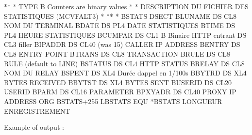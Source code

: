 \documentclass[letterpaper,10pt,english]{sphinxmanual}
\begin{document}
\begin{sphinxVerbatim}[commandchars=\\\{\}]
*\PYGZhy{}\PYGZhy{}\PYGZhy{}\PYGZhy{}\PYGZhy{}\PYGZhy{}\PYGZhy{}\PYGZhy{}\PYGZhy{}\PYGZhy{}\PYGZhy{}\PYGZhy{}\PYGZhy{}\PYGZhy{}\PYGZhy{}\PYGZhy{}\PYGZhy{}\PYGZhy{}\PYGZhy{}\PYGZhy{}\PYGZhy{}\PYGZhy{}\PYGZhy{}\PYGZhy{}\PYGZhy{}\PYGZhy{}\PYGZhy{}\PYGZhy{}\PYGZhy{}\PYGZhy{}\PYGZhy{}\PYGZhy{}\PYGZhy{}\PYGZhy{}\PYGZhy{}\PYGZhy{}\PYGZhy{}\PYGZhy{}\PYGZhy{}\PYGZhy{}\PYGZhy{}\PYGZhy{}\PYGZhy{}\PYGZhy{}\PYGZhy{}\PYGZhy{}\PYGZhy{}\PYGZhy{}\PYGZhy{}\PYGZhy{}\PYGZhy{}\PYGZhy{}\PYGZhy{}\PYGZhy{}\PYGZhy{}\PYGZhy{}\PYGZhy{}\PYGZhy{}\PYGZhy{}\PYGZhy{}*
*        TYPE B \PYGZhy{} Counters are binary values                 *
*        DESCRIPTION DU FICHIER DES STATISTIQUES (MCVFALT3)  *
*\PYGZhy{}\PYGZhy{}\PYGZhy{}\PYGZhy{}\PYGZhy{}\PYGZhy{}\PYGZhy{}\PYGZhy{}\PYGZhy{}\PYGZhy{}\PYGZhy{}\PYGZhy{}\PYGZhy{}\PYGZhy{}\PYGZhy{}\PYGZhy{}\PYGZhy{}\PYGZhy{}\PYGZhy{}\PYGZhy{}\PYGZhy{}\PYGZhy{}\PYGZhy{}\PYGZhy{}\PYGZhy{}\PYGZhy{}\PYGZhy{}\PYGZhy{}\PYGZhy{}\PYGZhy{}\PYGZhy{}\PYGZhy{}\PYGZhy{}\PYGZhy{}\PYGZhy{}\PYGZhy{}\PYGZhy{}\PYGZhy{}\PYGZhy{}\PYGZhy{}\PYGZhy{}\PYGZhy{}\PYGZhy{}\PYGZhy{}\PYGZhy{}\PYGZhy{}\PYGZhy{}\PYGZhy{}\PYGZhy{}\PYGZhy{}\PYGZhy{}\PYGZhy{}\PYGZhy{}\PYGZhy{}\PYGZhy{}\PYGZhy{}\PYGZhy{}\PYGZhy{}\PYGZhy{}\PYGZhy{}*
*
BSTATS   DSECT
B\PYGZdl{}LUNAME DS    CL8                     NOM DU TERMINAL
B\PYGZdl{}DATE   DS    PL4                     DATE STATISTIQUES
B\PYGZdl{}TIME   DS    PL4                     HEURE STATISTIQUES
B\PYGZdl{}CUMPAR DS    CL1                     B Binaire HTTP entrant
         DS    CL3                     filler
B\PYGZdl{}IPADDR DS    CL40  (was 15)          CALLER IP ADDRESS
B\PYGZdl{}ENTRY  DS    CL8                     ENTRY POINT
B\PYGZdl{}TRANS  DS    CL8                     TRANSACTION
B\PYGZdl{}RULE   DS    CL8                     RULE (default to LINE)
B\PYGZdl{}STATUS DS    CL4                     HTTP STATUS
B\PYGZdl{}RELAY  DS    CL8                     NOM DU RELAY
B\PYGZdl{}SPENT  DS    XL4                     Durée d\PYGZsq{}appel en 1/100s
B\PYGZdl{}BYTRD  DS    XL4                     BYTES RECEIVED
B\PYGZdl{}BYTST  DS    XL4                     BYTES SENT
B\PYGZdl{}USERID DS    CL20                    USERID
B\PYGZdl{}PARM   DS    CL16                    PARAMETER
B\PYGZdl{}PXYADR DS    CL40                    PROXY IP ADDRESS
        ORG   BSTATS+255
LBSTATS  EQU   *\PYGZhy{}BSTATS                LONGUEUR ENREGISTREMENT
\end{sphinxVerbatim}

\sphinxAtStartPar
Example of output : \sphinxhyphen{}

\sphinxAtStartPar
{}
\end{document}
